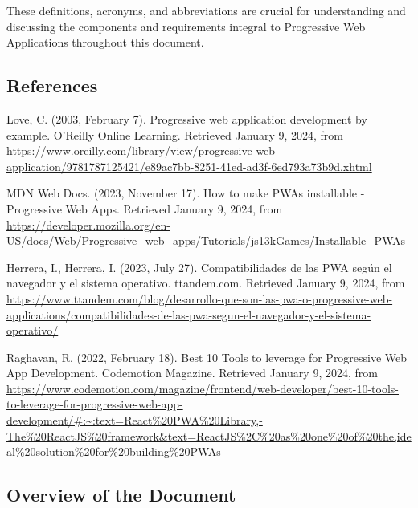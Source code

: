 \documentclass[12pt,a4paper, twosite]{article}
\begin{document}
These definitions, acronyms, and abbreviations are crucial for understanding and discussing the components and requirements integral to Progressive Web Applications throughout this document.

\subsection{References}
\label{sec:org62711e0}


\begin{thebibliography}{9}

  Love, C. (2003, February 7). Progressive web application development by example. O’Reilly Online Learning. Retrieved January 9, 2024, from \url{https://www.oreilly.com/library/view/progressive-web-application/9781787125421/e89ac7bb-8251-41ed-ad3f-6ed793a73b9d.xhtml}
  
  MDN Web Docs. (2023, November 17). How to make PWAs installable - Progressive Web Apps. Retrieved January 9, 2024, from \url{https://developer.mozilla.org/en-US/docs/Web/Progressive_web_apps/Tutorials/js13kGames/Installable_PWAs}
  
  Herrera, I., Herrera, I. (2023, July 27). Compatibilidades de las PWA según el navegador y el sistema operativo. ttandem.com. Retrieved January 9, 2024, from \url{https://www.ttandem.com/blog/desarrollo-que-son-las-pwa-o-progressive-web-applications/compatibilidades-de-las-pwa-segun-el-navegador-y-el-sistema-operativo/}
  
  Raghavan, R. (2022, February 18). Best 10 Tools to leverage for Progressive Web App Development. Codemotion Magazine. Retrieved January 9, 2024, from \url{https://www.codemotion.com/magazine/frontend/web-developer/best-10-tools-to-leverage-for-progressive-web-app-development/#:~:text=React%20PWA%20Library,-The%20ReactJS%20framework&text=ReactJS%2C%20as%20one%20of%20the,ideal%20solution%20for%20building%20PWAs}
  
\end{thebibliography}


\subsection{Overview of the Document}
\label{sec:orgdaca22c}
\end{document}
